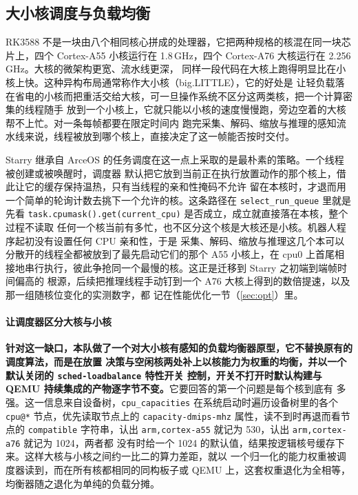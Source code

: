 \subsection{大小核调度与负载均衡}\label{sec:sched}

RK3588 不是一块由八个相同核心拼成的处理器，它把两种规格的核混在同一块芯片上，四个 Cortex-A55
小核运行在 1.8\,GHz，四个 Cortex-A76 大核运行在 2.256\,GHz。大核的微架构更宽、流水线更深，
同样一段代码在大核上跑得明显比在小核上快。这种异构布局通常称作大小核（big.LITTLE），它的好处是
让轻负载落在省电的小核而把重活交给大核，可一旦操作系统不区分这两类核，把一个计算密集的线程随手
放到一个小核上，它就只能以小核的速度慢慢跑，旁边空着的大核帮不上忙。对一条每帧都要在限定时间内
跑完采集、解码、缩放与推理的感知流水线来说，线程被放到哪个核上，直接决定了这一帧能否按时交付。

Starry 继承自 ArceOS 的任务调度在这一点上采取的是最朴素的策略。一个线程被创建或被唤醒时，调度器
默认把它放到当前正在执行放置动作的那个核上，借此让它的缓存保持温热，只有当线程的亲和性掩码不允许
留在本核时，才退而用一个简单的轮询计数去挑下一个允许的核。这条路径在 \texttt{select\_run\_queue}
里就是先看 \texttt{task.cpumask().get(current\_cpu)} 是否成立，成立就直接落在本核，整个过程不读取
任何一个核当前有多忙，也不区分这个核是大核还是小核。机器人程序起初没有设置任何 CPU 亲和性，于是
采集、解码、缩放与推理这几个本可以分散开的线程全都被放到了最先启动它们的那个 A55 小核上，在
cpu0 上首尾相接地串行执行，彼此争抢同一个最慢的核。这正是迁移到 Starry 之初端到端帧时间偏高的
根源，后续把推理线程手动钉到一个 A76 大核上得到的数倍提速，以及那一组随核位变化的实测数字，都
记在性能优化一节（\ref{sec:opt}）里。

\paragraph{让调度器区分大核与小核}
\textbf{针对这一缺口，本队做了一个对大小核有感知的负载均衡器原型，它不替换原有的调度算法，而是在放置
决策与空闲核两处补上以核能力为权重的均衡，并以一个默认关闭的 \texttt{sched-loadbalance} 特性开关
控制，开关不打开时默认构建与 QEMU 持续集成的产物逐字节不变。}它要回答的第一个问题是每个核到底有
多强。这一信息来自设备树，\texttt{cpu\_capacities} 在系统启动时遍历设备树里的各个 \texttt{cpu@*}
节点，优先读取节点上的 \texttt{capacity-dmips-mhz} 属性，读不到时再退而看节点的 \texttt{compatible}
字符串，认出 \texttt{arm,cortex-a55} 就记为 530，认出 \texttt{arm,cortex-a76} 就记为 1024，两者都
没有时给一个 1024 的默认值，结果按逻辑核号缓存下来。这样大核与小核之间约一比二的算力差距，就以
一个归一化的能力权重被调度器读到，而在所有核都相同的同构板子或 QEMU 上，这套权重退化为全相等，
均衡器随之退化为单纯的负载分摊。

